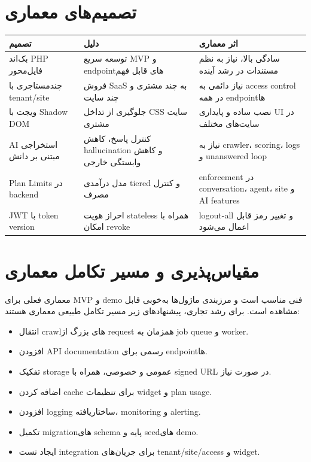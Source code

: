 \documentclass[12pt,a4paper]{article}
\begin{document}
\section{تصمیم‌های معماری}
\begin{longtable}{>{\raggedleft\arraybackslash}p{4.2cm} p{6cm} p{4.2cm}}
\toprule
\textbf{تصمیم} & \textbf{دلیل} & \textbf{اثر معماری} \\
\midrule
بک‌اند PHP فایل‌محور & توسعه سریع MVP و endpointهای قابل فهم & سادگی بالا، نیاز به نظم مستندات در رشد آینده \\
چندمستاجری با tenant/site & فروش SaaS به چند مشتری و چند سایت & نیاز دائمی به access control در همه endpointها \\
ویجت با Shadow DOM & جلوگیری از تداخل CSS سایت مشتری & نصب ساده و پایداری UI در سایت‌های مختلف \\
AI استخراجی مبتنی بر دانش & کنترل پاسخ، کاهش hallucination و کاهش وابستگی خارجی & نیاز به crawler، scoring، logs و unanswered loop \\
Plan Limits در backend & مدل درآمدی tiered و کنترل مصرف & enforcement در conversation، agent، site و AI features \\
JWT با token version & احراز هویت stateless همراه با امکان revoke & logout-all و تغییر رمز قابل اعمال می‌شود \\
\bottomrule
\end{longtable}

\section{مقیاس‌پذیری و مسیر تکامل معماری}
معماری فعلی برای MVP و demo فنی مناسب است و مرزبندی ماژول‌ها به‌خوبی قابل مشاهده است. برای رشد تجاری، پیشنهادهای زیر مسیر تکامل طبیعی معماری هستند:
\begin{itemize}
  \item انتقال crawlهای بزرگ از request همزمان به job queue و worker.
  \item افزودن API documentation رسمی برای endpointها.
  \item تفکیک storage عمومی و خصوصی، همراه با signed URL در صورت نیاز.
  \item اضافه کردن cache برای تنظیمات widget و plan usage.
  \item افزودن logging ساختاریافته، monitoring و alerting.
  \item تکمیل migrationهای schema پایه و seedهای demo.
  \item ایجاد تست integration برای جریان‌های tenant/site/access و widget.
\end{itemize}
\end{document}
